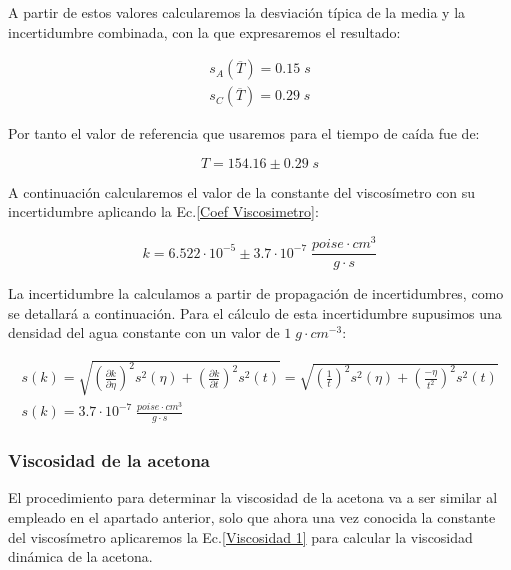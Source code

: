 \documentclass[a4paper,12pt,titlepage]{report}
\begin{document}
    A partir de estos valores calcularemos la desviación típica de la media y la incertidumbre combinada, con la que expresaremos el resultado:
    
    \begin{equation}
        \begin{gathered}
            s_A(\overline{T}) = 0.15 \; s \\
            s_C(\overline{T}) = 0.29 \; s
        \end{gathered}
    \end{equation}
    
Por tanto el valor de referencia que usaremos para el tiempo de caída fue de:
    
\begin{equation}
    T = 154.16 \pm 0.29 \; s
\end{equation}

A continuación calcularemos el valor de la constante del viscosímetro con su incertidumbre aplicando la Ec.\ref{Coef Viscosimetro}:

\begin{equation}
    k = 6.522 \cdot 10^{-5 }\pm 3.7 \cdot 10^{-7} \; \frac{poise\cdot cm^3}{g\cdot s}
\end{equation}

La incertidumbre la calculamos a partir de propagación de incertidumbres, como se detallará a continuación. Para el cálculo de esta incertidumbre supusimos una densidad del agua constante con un valor de $1 \; g\cdot cm^{-3}$:

\begin{equation}
    \begin{gathered}
        s(k) = \sqrt{\left (\frac{\partial k}{\partial \eta }\right )^2 s^2(\eta) + \left (\frac{\partial k}{\partial t}\right )^2s^2(t)} = \sqrt{\left (\frac{1}{t}\right )^2s^2(\eta) + \left (\frac{-\eta}{t^2}\right )^2s^2(t)} \\ s(k) = 3.7 \cdot 10^{-7} \; \frac{poise\cdot cm^3}{g\cdot s}
    \end{gathered}
\end{equation}

\subsubsection{Viscosidad de la acetona}

El procedimiento para determinar la viscosidad de la acetona va a ser similar al empleado en el apartado anterior, solo que ahora una vez conocida la constante del viscosímetro aplicaremos la Ec.\ref{Viscosidad 1} para calcular la viscosidad dinámica de la acetona.
\end{document}
